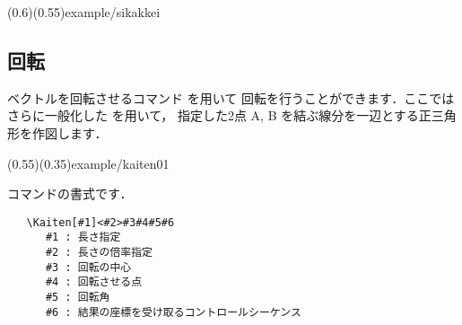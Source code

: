 \showexample[平行四辺形](0.6)(0.55){example/sikakkei}

\subsection{回転}
ベクトルを回転させるコマンド  を用いて
回転を行うことができます．ここではさらに一般化した
 を用いて，
指定した2点 A, B を結ぶ線分を一辺とする正三角形を作図します．

\showexample[回転](0.55)(0.35){example/kaiten01}

 コマンドの書式です．
\begin{boxnote}
\begin{verbatim}
   \Kaiten[#1]<#2>#3#4#5#6
      #1 : 長さ指定
      #2 : 長さの倍率指定
      #3 : 回転の中心
      #4 : 回転させる点
      #5 : 回転角
      #6 : 結果の座標を受け取るコントロールシーケンス
\end{verbatim}
\end{boxnote}
